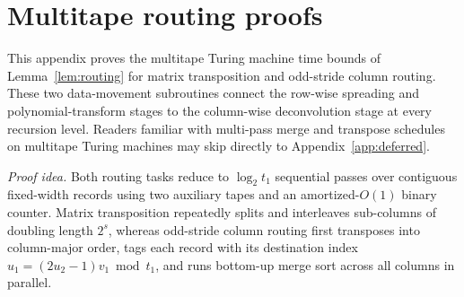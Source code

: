 \section{Multitape routing proofs}\label{app:routing}

This appendix proves the multitape Turing machine time bounds of Lemma~\ref{lem:routing} for matrix transposition and odd-stride column routing. These two data-movement subroutines connect the row-wise spreading and polynomial-transform stages to the column-wise deconvolution stage at every recursion level. Readers familiar with multi-pass merge and transpose schedules on multitape Turing machines may skip directly to Appendix~\ref{app:deferred}.

\medskip\noindent\emph{Proof idea.} Both routing tasks reduce to $\log_2 t_1$ sequential passes over contiguous fixed-width records using two auxiliary tapes and an amortized-$O(1)$ binary counter. Matrix transposition repeatedly splits and interleaves sub-columns of doubling length $2^s$, whereas odd-stride column routing first transposes into column-major order, tags each record with its destination index $u_1 = (2u_2 - 1)v_1 \bmod t_1$, and runs bottom-up merge sort across all columns in parallel.

